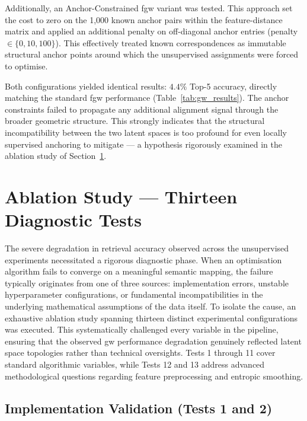 Additionally, an Anchor-Constrained \gls{fgw} variant was tested. This approach set the cost to zero on the 1,000 known anchor pairs within the feature-distance matrix and applied an additional penalty on off-diagonal anchor entries (penalty $\in \{0, 10, 100\}$). This effectively treated known correspondences as immutable structural anchor points around which the unsupervised assignments were forced to optimise.

Both configurations yielded identical results: $4.4\%$ Top-5 accuracy, directly matching the standard \gls{fgw} performance (Table~\ref{tab:gw_results}). The anchor constraints failed to propagate any additional alignment signal through the broader geometric structure. This strongly indicates that the structural incompatibility between the two latent spaces is too profound for even locally supervised anchoring to mitigate --- a hypothesis rigorously examined in the ablation study of Section~\ref{sec:ablation_study}.

\section{Ablation Study --- Thirteen Diagnostic Tests}
\label{sec:ablation_study}

The severe degradation in retrieval accuracy observed across the unsupervised experiments necessitated a rigorous diagnostic phase. When an optimisation algorithm fails to converge on a meaningful semantic mapping, the failure typically originates from one of three sources: implementation errors, unstable hyperparameter configurations, or fundamental incompatibilities in the underlying mathematical assumptions of the data itself. To isolate the cause, an exhaustive ablation study spanning thirteen distinct experimental configurations was executed. This systematically challenged every variable in the pipeline, ensuring that the observed \gls{gw} performance degradation genuinely reflected latent space topologies rather than technical oversights. Tests 1 through 11 cover standard algorithmic variables, while Tests 12 and 13 address advanced methodological questions regarding feature preprocessing and entropic smoothing.

\subsection{Implementation Validation (Tests 1 and 2)}
\label{subsec:implementation_validation}

